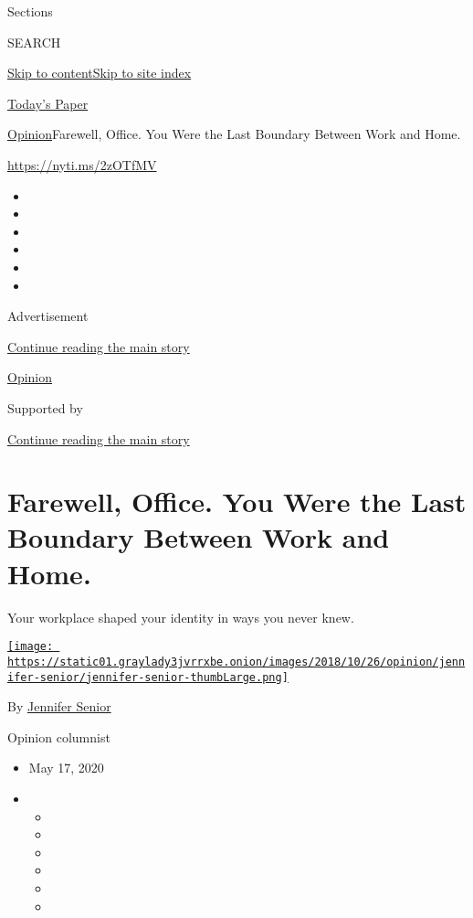 Sections

SEARCH

\protect\hyperlink{site-content}{Skip to
content}\protect\hyperlink{site-index}{Skip to site index}

\href{https://myaccount.nytimes3xbfgragh.onion/auth/login?response_type=cookie\&client_id=vi}{}

\href{https://www.nytimes3xbfgragh.onion/section/todayspaper}{Today's
Paper}

\href{/section/opinion}{Opinion}\textbar{}Farewell, Office. You Were the
Last Boundary Between Work and Home.

\url{https://nyti.ms/2zOTfMV}

\begin{itemize}
\item
\item
\item
\item
\item
\item
\end{itemize}

Advertisement

\protect\hyperlink{after-top}{Continue reading the main story}

\href{/section/opinion}{Opinion}

Supported by

\protect\hyperlink{after-sponsor}{Continue reading the main story}

\hypertarget{farewell-office-you-were-the-last-boundary-between-work-and-home}{%
\section{Farewell, Office. You Were the Last Boundary Between Work and
Home.}\label{farewell-office-you-were-the-last-boundary-between-work-and-home}}

Your workplace shaped your identity in ways you never knew.

\href{https://www.nytimes3xbfgragh.onion/by/jennifer-senior}{\texttt{[image: https://static01.graylady3jvrrxbe.onion/images/2018/10/26/opinion/jennifer-senior/jennifer-senior-thumbLarge.png]}}

By \href{https://www.nytimes3xbfgragh.onion/by/jennifer-senior}{Jennifer
Senior}

Opinion columnist

\begin{itemize}
\item
  May 17, 2020
\item
  \begin{itemize}
  \item
  \item
  \item
  \item
  \item
  \item
  \end{itemize}
\end{itemize}

